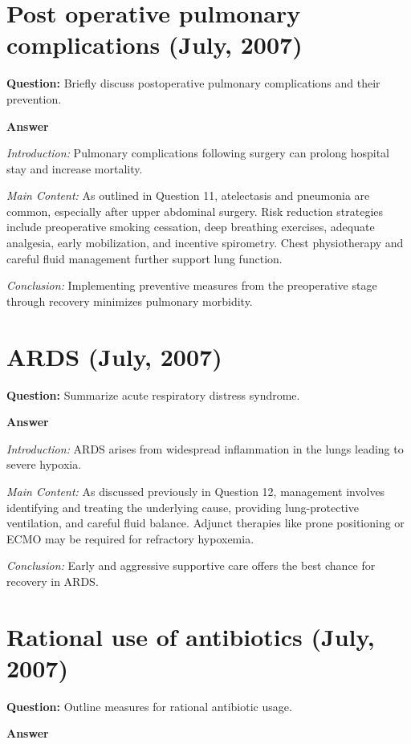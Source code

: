 \documentclass{article}
\begin{document}
\section{Post operative pulmonary complications (July, 2007)}


\textbf{Question:} Briefly discuss postoperative pulmonary complications and their prevention.

\textbf{Answer}

\emph{Introduction:} Pulmonary complications following surgery can prolong hospital stay and increase mortality.

\emph{Main Content:} As outlined in Question 11, atelectasis and pneumonia are common, especially after upper abdominal surgery. Risk reduction strategies include preoperative smoking cessation, deep breathing exercises, adequate analgesia, early mobilization, and incentive spirometry. Chest physiotherapy and careful fluid management further support lung function.

\emph{Conclusion:} Implementing preventive measures from the preoperative stage through recovery minimizes pulmonary morbidity.


\section{ARDS (July, 2007)}


\textbf{Question:} Summarize acute respiratory distress syndrome.

\textbf{Answer}

\emph{Introduction:} ARDS arises from widespread inflammation in the lungs leading to severe hypoxia.

\emph{Main Content:} As discussed previously in Question 12, management involves identifying and treating the underlying cause, providing lung-protective ventilation, and careful fluid balance. Adjunct therapies like prone positioning or ECMO may be required for refractory hypoxemia.

\emph{Conclusion:} Early and aggressive supportive care offers the best chance for recovery in ARDS.


\section{Rational use of antibiotics (July, 2007)}


\textbf{Question:} Outline measures for rational antibiotic usage.

\textbf{Answer}
\end{document}
